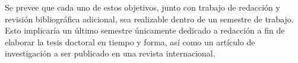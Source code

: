 \documentclass[10pt,a4paper]{report}
\begin{document}
Se prevee que cada uno de estos objetivos, junto con trabajo de redacción y revisión bibliográfica adicional, sea realizable dentro de un semestre de trabajo. Esto implicaría un último semestre únicamente dedicado a redacción a fin de elaborar la tesis doctoral en tiempo y forma, así como un artículo de investigación a ser publicado en una revista internacional.











\end{document}
